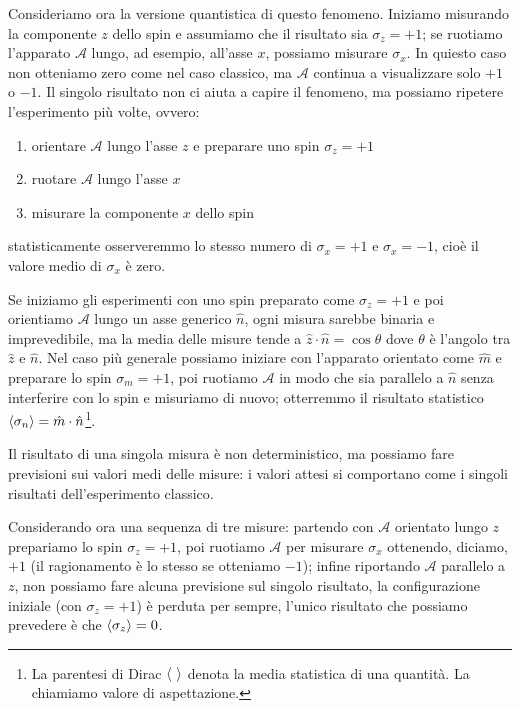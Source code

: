 Consideriamo ora la versione quantistica di questo fenomeno. Iniziamo misurando la componente $z$ dello spin e assumiamo che il risultato sia $\sigma_z = +1$; se ruotiamo l'apparato $\mathcal{A}$ lungo, ad esempio, all'asse $x$, possiamo misurare $\sigma_x$. In quiesto caso non otteniamo zero come nel caso classico, ma $\mathcal{A}$ continua a visualizzare solo $+1$ o $-1$. Il singolo risultato non ci aiuta a capire il fenomeno, ma possiamo ripetere l'esperimento più volte, ovvero:
\begin{enumerate}
	\item orientare $\mathcal{A}$ lungo l'asse $z$ e preparare uno spin $\sigma_z = +1$
	\item ruotare $\mathcal{A}$ lungo l'asse $x$
	\item misurare la componente $x$ dello spin
\end{enumerate}
statisticamente osserveremmo lo stesso numero di $\sigma_x = +1$ e $\sigma_x = -1$, cioè il valore medio di $\sigma_x$ è zero.

Se iniziamo gli esperimenti con uno spin preparato come $\sigma_z = +1$ e poi orientiamo $\mathcal{A}$ lungo un asse generico $\hat{n}$, ogni misura sarebbe binaria e imprevedibile, ma la media delle misure tende a $\hat{z}\cdot\hat{n}=\cos\theta$ dove $\theta$ è l'angolo tra $\hat{z}$ e $\hat{n}$. Nel caso più generale possiamo iniziare con l'apparato orientato come $\hat{m}$ e preparare lo spin $\sigma_m = +1$, poi ruotiamo $\mathcal{A}$ in modo che sia parallelo a $\hat{n}$ senza interferire con lo spin e misuriamo di nuovo; otterremmo il risultato statistico $\Braket{\sigma_n} = \hat{m}\cdot\hat{n}$\footnote{La parentesi di Dirac $\braket{\ }$ denota la media statistica di una quantità. La chiamiamo valore di aspettazione.}.

Il risultato di una singola misura è non deterministico, ma possiamo fare previsioni sui valori medi delle misure: i valori attesi si comportano come i singoli risultati dell'esperimento classico.

Considerando ora una sequenza di tre misure: partendo con $\mathcal{A}$ orientato lungo $z$ prepariamo lo spin $\sigma_z=+1$, poi ruotiamo $\mathcal{A}$ per misurare $\sigma_x$ ottenendo, diciamo, $+1$ (il ragionamento è lo stesso se otteniamo $-1$); infine riportando $\mathcal{A}$ parallelo a $z$, non possiamo fare alcuna previsione sul singolo risultato, la configurazione iniziale (con $\sigma_z=+1$) è perduta per sempre, l'unico risultato che possiamo prevedere è che $\Braket{\sigma_z} = 0$.

